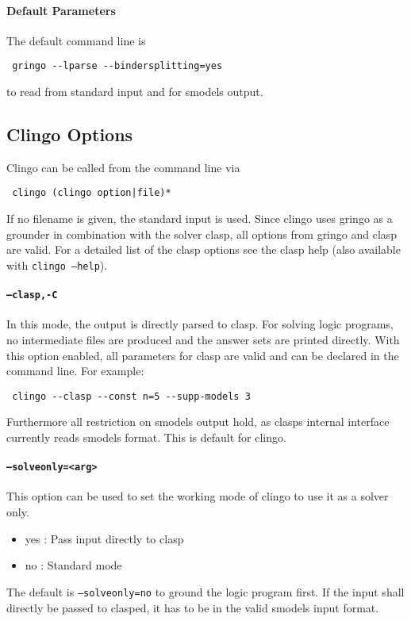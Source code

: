 \documentclass[a4paper,10pt]{article}
\begin{document}
\paragraph{Default Parameters}
The default command line is
\begin{verbatim}
 gringo --lparse --bindersplitting=yes
\end{verbatim}
to read from standard input and for smodels output.

\subsection{Clingo Options}

Clingo can be called from the command line via
\begin{verbatim}
 clingo (clingo option|file)*
\end{verbatim}
If no filename is given, the standard input is used.
Since clingo uses gringo as a grounder in combination with the solver clasp, all options from gringo and clasp are valid. For a detailed list of the clasp options see the clasp help (also available with \texttt{clingo --help}).
\paragraph{\texttt{--clasp,-C}}
In this mode, the output is directly parsed to clasp. For solving logic programs, no intermediate files are produced and the answer sets are printed directly.
With this option enabled, all parameters for clasp are valid and can be declared in the command line.
For example:
\begin{verbatim}
 clingo --clasp --const n=5 --supp-models 3
\end{verbatim}
Furthermore all restriction on smodels output hold, as clasps internal interface currently reads smodels format.
This is default for clingo.
\paragraph{\texttt{--solveonly=<arg>}}
This option can be used to set the working mode of clingo to use it as a solver only.
\begin{itemize}
\item yes : Pass input directly to clasp
\item no : Standard mode
\end{itemize}
The default is \texttt{--solveonly=no} to ground the logic program first.
If the input shall directly be passed to clasped, it has to be in the valid smodels input format.
\end{document}
